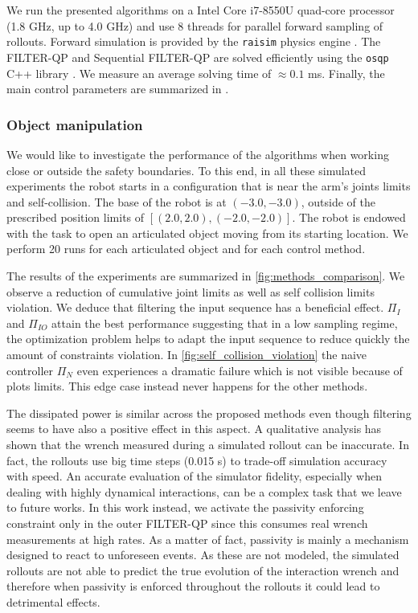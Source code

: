 We run the presented algorithms on a Intel Core i7-8550U quad-core processor (1.8 GHz, up to 4.0 GHz) and use 8 threads for parallel forward sampling of rollouts. Forward simulation is provided by the \texttt{raisim} physics engine \cite{raisim}. The FILTER-QP and Sequential FILTER-QP are solved efficiently using the \texttt{osqp} C++ library \cite{osqp}. We measure an average solving time of $\approx 0.1$ ms. Finally, the main control parameters are summarized in \tab {}.  


\vspace{0.3cm}
\subsubsection{Object manipulation}
We would like to investigate the performance of the algorithms when working close or outside the safety boundaries. To this end, in all these simulated experiments the robot starts in a configuration that is near the arm's joints limits and self-collision. The base of the robot is at $(-3.0, -3.0)$, outside of the prescribed position limits of $[(2.0, 2.0), (-2.0, -2.0)]$. The robot is endowed with the task to open an articulated object moving from its starting location. We perform 20 runs for each articulated object and for each control method.

The results of the experiments are summarized in \fig \ref{fig:methods_comparison}. We observe a reduction of cumulative joint limits as well as self collision limits violation. We deduce that filtering the input sequence has a beneficial effect. $\Pi_{I}$ and $\Pi_{IO}$ attain the best performance suggesting that in a low sampling regime, the optimization problem helps to adapt the input sequence to reduce quickly the amount of constraints violation. In \fig \ref{fig:self_collision_violation} the naive controller $\Pi_{N}$ even experiences a dramatic failure which is not visible because of plots limits. This edge case instead never happens for the other methods. 

The dissipated power is similar across the proposed methods even though filtering seems to have also a positive effect in this aspect. A qualitative analysis has shown that the wrench measured during a simulated rollout can be inaccurate. In fact, the rollouts use big time steps (0.015 s) to trade-off simulation accuracy with speed. An accurate evaluation of the simulator fidelity, especially when dealing with highly dynamical interactions, can be a complex task that we leave to future works. In this work instead, we activate the passivity enforcing constraint only in the outer FILTER-QP since this consumes real wrench measurements at high rates. As a matter of fact, passivity is mainly a mechanism designed to react to unforeseen events. As these are not modeled, the simulated rollouts are not able to predict the true evolution of the interaction wrench and therefore when passivity is enforced throughout the rollouts it could lead to detrimental effects.

